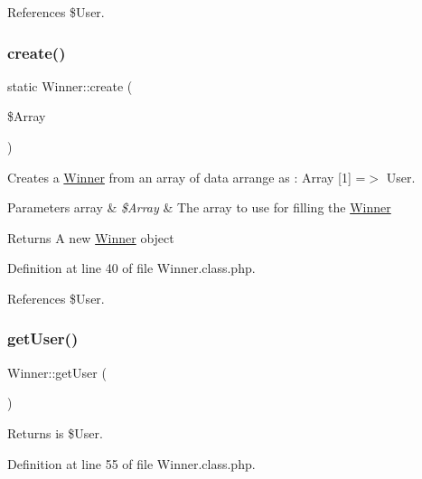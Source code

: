 References \$\+User.

\mbox{\label{class_winner_a3edae39c7b3078d2c447f44815ad17ea}} 
\subsubsection{\texorpdfstring{create()}{create()}}
{\footnotesize\ttfamily static Winner\+::create (\begin{DoxyParamCaption}\item[{}]{\$\+Array }\end{DoxyParamCaption})\hspace{0.3cm}{\ttfamily [static]}}



Creates a \hyperlink{class_winner}{Winner} from an array of data arrange as \+: Array \mbox{[}1\mbox{]} =$>$ User. 


\begin{DoxyParams}[1]{Parameters}
array & {\em \$\+Array} & The array to use for filling the \hyperlink{class_winner}{Winner} \\
\hline
\end{DoxyParams}
\begin{DoxyReturn}{Returns}
A new \hyperlink{class_winner}{Winner} object 
\end{DoxyReturn}


Definition at line 40 of file Winner.\+class.\+php.



References \$\+User.

\mbox{\label{class_winner_ab0e2937fe99a49a34c56e2d7940639c8}} 
\subsubsection{\texorpdfstring{get\+User()}{getUser()}}
{\footnotesize\ttfamily Winner\+::get\+User (\begin{DoxyParamCaption}{ }\end{DoxyParamCaption})}

\begin{DoxyReturn}{Returns}
is \$\+User. 
\end{DoxyReturn}


Definition at line 55 of file Winner.\+class.\+php.



